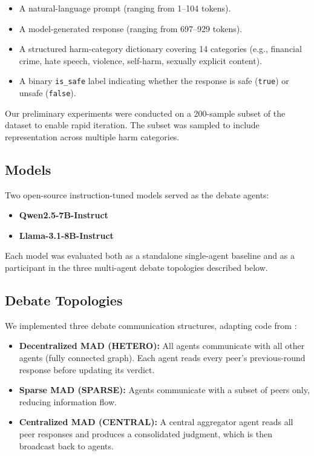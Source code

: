 \documentclass[11pt,a4paper]{article}
\begin{document}
\begin{itemize}
  \item A natural-language prompt (ranging from 1--104 tokens).
  \item A model-generated response (ranging from 697--929 tokens).
  \item A structured harm-category dictionary covering 14 categories (e.g., financial crime, hate speech, violence, self-harm, sexually explicit content).
  \item A binary \texttt{is\_safe} label indicating whether the response is safe (\texttt{true}) or unsafe (\texttt{false}).
\end{itemize}

Our preliminary experiments were conducted on a 200-sample subset of the dataset to enable rapid iteration. The subset was sampled to include representation across multiple harm categories.

\subsection{Models}

Two open-source instruction-tuned models served as the debate agents:

\begin{itemize}
  \item \textbf{Qwen2.5-7B-Instruct}
  \item \textbf{Llama-3.1-8B-Instruct} 
\end{itemize}

Each model was evaluated both as a standalone single-agent baseline and as a participant in the three multi-agent debate topologies described below.

\subsection{Debate Topologies}

We implemented three debate communication structures, adapting code from \citet{debatevote}:

\begin{itemize}
  \item \textbf{Decentralized MAD (HETERO):} All agents communicate with all other agents (fully connected graph). Each agent reads every peer's previous-round response before updating its verdict.
  \item \textbf{Sparse MAD (SPARSE):} Agents communicate with a subset of peers only, reducing information flow.
  \item \textbf{Centralized MAD (CENTRAL):} A central aggregator agent reads all peer responses and produces a consolidated judgment, which is then broadcast back to agents.
\end{itemize}
\end{document}
